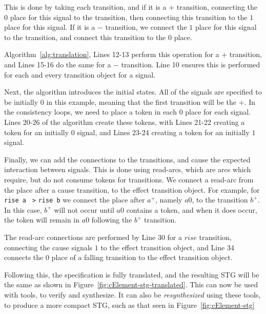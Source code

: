 \documentclass[british, 10pt, conference, compsocconf]{IEEEtran}
\begin{document}
This is done by taking each transition, and if it is a $+$ transition, 
connecting the $0$ place for this signal to the transition, then connecting 
this transition to the $1$ place for this signal. If it is a $-$ 
transition, we connect the $1$ place for this signal to the transition, and 
connect this transition to the $0$ place.

Algorithm~\ref{alg:translation}, Lines 12-13 perform this operation for a $+$ transition,
and Lines 15-16 do the same for a $-$ transition. Line 10 ensures this is performed for 
each and every transition object for a signal.


Next, the algorithm introduces the initial states. All of the signals are 
specified to be initially 0 in this example, meaning that the first transition will be the $+$.
In the consistency loops, we need to place a token 
in each $0$ place for each signal. Lines 20-26 of the algorithm create these tokens,
with Lines 21-22 creating a token for an initially $0$ signal, and Lines 23-24 
creating a token for an initially $1$ signal. 

Finally, we can add the connections to the transitions, and cause the 
expected interaction between signals. This is done using read-arcs, which 
are arcs which require, but do not consume tokens for transitions. We
connect a read-arc from the place after a cause transition, to the effect transition object. 
For example, for \texttt{rise a} \texttt{~>} \texttt{rise b} we connect the place after $a^{+}$, namely $a0$,
to the transition $b^{+}$. In this case, $b^{+}$ will not occur until $a0$ contains a token,
and when it does occur, the token will remain in $a0$ following the $b^{+}$ transition. 

The read-arc connections are performed by Line 30 for a $rise$ transition, connecting the
cause signals $1$ to the effect transition object, and Line 34 connects the $0$ place of a 
falling transition to the effect transition object. 

Following this, the specification is fully translated, and the resulting STG 
will be the same as shown in Figure~\ref{fig:cElement-stg-translated}. 
This can now be used with tools, to verify and synthesize. It can also be
\emph{resynthesized} using these tools, to produce a more compact STG,
such as that seen in Figure~\ref{fig:cElement-stg}
\end{document}
